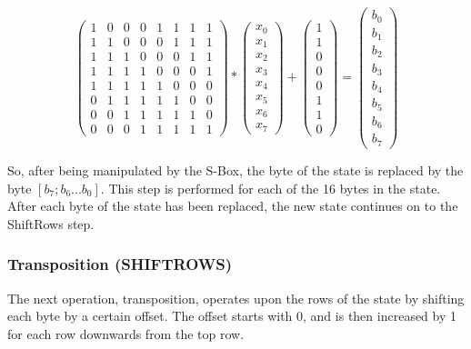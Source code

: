 \documentclass[12pt]{report}
\theoremstyle{definition}
\theoremstyle{remark}
\begin{document}
\[ \left( \begin{array}{cccccccc}
1 & 0 & 0 & 0 & 1 & 1 & 1 & 1 \\
1 & 1 & 0 & 0 & 0 & 1 & 1 & 1 \\
1 & 1 & 1 & 0 & 0 & 0 & 1 & 1 \\
1 & 1 & 1 & 1 & 0 & 0 & 0 & 1 \\
1 & 1 & 1 & 1 & 1 & 0 & 0 & 0 \\
0 & 1 & 1 & 1 & 1 & 1 & 0 & 0 \\
0 & 0 & 1 & 1 & 1 & 1 & 1 & 0 \\
0 & 0 & 0 & 1 & 1 & 1 & 1 & 1\end{array} \right)
*
\left( \begin{array}{c}
x_0 \\
x_1 \\
x_2 \\
x_3 \\
x_4 \\
x_5 \\
x_6 \\
x_7\end{array} \right)
+
\left( \begin{array}{c}
1 \\
1 \\
0 \\
0 \\
0 \\
1 \\
1 \\
0\end{array} \right)
=
\left( \begin{array}{c}
b_0 \\
b_1 \\
b_2 \\
b_3 \\
b_4 \\
b_5 \\
b_6 \\
b_7\end{array} \right)
\]

So, after being manipulated by the S-Box, the byte of the state is replaced by the byte $[b_7; b_6 ... b_0 ]$. This step is performed for each of the 16 bytes in the state. After each byte of the state has been replaced, the new state continues on to the ShiftRows step.

\subsubsection{Transposition (SHIFTROWS)}
The next operation, transposition, operates upon the rows of the state by shifting each byte by a certain offset. The offset starts with 0, and is then increased by 1 for each row downwards from the top row.
\end{document}
